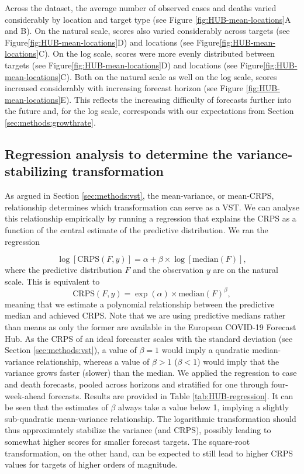\documentclass{article}
\begin{document}
Across the dataset, the average number of observed cases and deaths varied considerably by location and target type (see Figure \ref{fig:HUB-mean-locations}A and B). On the natural scale, scores also varied considerably across targets (see Figure\ref{fig:HUB-mean-locations}D) and locations (see Figure\ref{fig:HUB-mean-locations}C). On the log scale, scores were more evenly distributed between targets (see Figure\ref{fig:HUB-mean-locations}D) and locations (see Figure\ref{fig:HUB-mean-locations}C). Both on the natural scale as well on the log scale, scores increased considerably with increasing forecast horizon (see Figure \ref{fig:HUB-mean-locations}E). This reflects the increasing difficulty of forecasts further into the future and, for the log scale, corresponds with our expectations from Section \ref{sec:methods:growthrate}. 





\subsection{Regression analysis to determine the variance-stabilizing transformation}
\label{sec:HUB-regression}

As argued in Section \ref{sec:methods:vst}, the mean-variance, or mean-CRPS, relationship determines which transformation can serve as a VST. We can analyse this relationship empirically by running a regression that explains the CRPS as a function of the central estimate of the predictive distribution. We ran the regression

\begin{equation*}
    \log[\text{CRPS}(F, y)] = \alpha + \beta \times \log[\text{median}(F)], 
\end{equation*}
where the predictive distribution $F$ and the observation $y$ are on the natural scale. This is equivalent to
\begin{equation*}
    \text{CRPS}(F, y) = \exp(\alpha) \times \text{median}(F)^\beta, 
\end{equation*}
meaning that we estimate a polynomial relationship between the predictive median and achieved CRPS. Note that we are using predictive medians rather than means as only the former are available in the European COVID-19 Forecast Hub. As the CRPS of an ideal forecaster scales with the standard deviation (see Section \ref{sec:methods:vst}), a value of $\beta = 1$ would imply a quadratic median-variance relationship, whereas a value of $\beta > 1$ ($\beta < 1$) would imply that the variance grows faster (slower) than the median. We applied the regression to case and death forecasts, pooled across horizons and stratified for one through four-week-ahead forecasts. Results are provided in Table \ref{tab:HUB-regression}. It can be seen that the estimates of $\beta$ always take a value below 1, implying a slightly sub-quadratic mean-variance relationship. The logarithmic transformation should thus approximately stabilize the variance (and CRPS), possibly leading to somewhat higher scores for smaller forecast targets. The square-root transformation, on the other hand, can be expected to still lead to higher CRPS values for targets of higher orders of magnitude.
\end{document}
